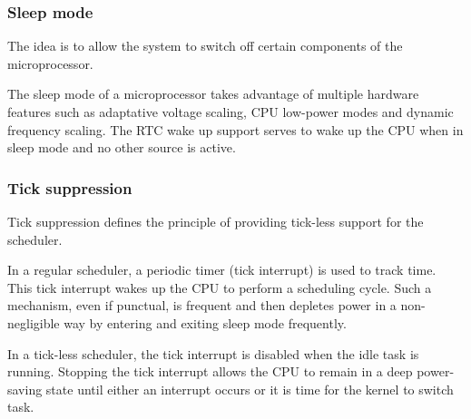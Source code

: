 \subsubsection{Sleep mode}
The idea is to allow the system to switch off certain components of the mi\-cro\-pro\-ces\-sor.

The sleep mode of a microprocessor takes advantage of multiple hardware features
    such as adaptative voltage scaling, CPU low-power modes and dynamic frequency scaling.
The RTC wake up support serves to wake up the CPU when in sleep mode and no other source is active.

\subsubsection{Tick suppression}
Tick suppression defines the principle of providing tick-less support for the scheduler.

In a regular scheduler, a periodic timer (tick interrupt) is used to track time.
This tick interrupt wakes up the CPU to perform a scheduling cycle.
Such a mechanism, even if punctual, is frequent and then depletes power in a non-negligible way by entering and exiting sleep mode frequently\cite{freertos-tick-supp}.

In a tick-less scheduler, the tick interrupt is disabled when the idle task is running.
Stopping the tick interrupt allows the CPU to remain in a deep power-saving state 
    until either an interrupt occurs or it is time for the kernel to switch task.


